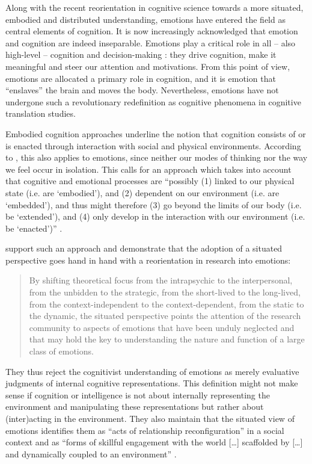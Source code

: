 \documentclass[output=paper]{langscibook}
\begin{document}
Along with the recent reorientation in cognitive science towards a more situated, embodied and distributed understanding, emotions have entered the field as central elements of cognition. It is now increasingly acknowledged that emotion and cognition are indeed inseparable. Emotions play a critical role in all -- also high-level -- cognition and decision-making \citep{Damasio1994, Damasio1999}: they drive cognition, make it meaningful and steer our attention and motivations. From this point of view, emotions are allocated a primary role in cognition, and it is emotion that “enslaves” the brain and moves the body. Nevertheless, emotions have not undergone such a revolutionary redefinition as cognitive phenomena in cognitive translation studies.

Embodied cognition approaches underline the notion that cognition consists of or is enacted through interaction with social and physical environments. According to \citet[67]{Stephan2014}, this also applies to emotions, since neither our modes of thinking nor the way we feel occur in isolation. This calls for an approach which takes into account that cognitive and emotional processes are “possibly (1) linked to our physical state (i.e. are ‘embodied’), and (2) dependent on our environment (i.e. are ‘embedded’), and thus might therefore (3) go beyond the limits of our body (i.e. be ‘extended’), and (4) only develop in the interaction with our environment (i.e. be ‘enacted’)” \citep[285; translated by the authors]{Wilutzky2011}.

\citet[438]{Griffiths2009} support such an approach and demonstrate that the adoption of a situated perspective goes hand in hand with a reorientation in research into emotions:

\begin{quote}\sloppy
    By shifting theoretical focus from the intrapsychic to the interpersonal, from the unbidden to the strategic, from the short-lived to the long-lived, from the context-independent to the context-dependent, from the static to the dynamic, the situated perspective points the attention of the research community to aspects of emotions that have been unduly neglected and that may hold the key to understanding the nature and function of a large class of emotions.\hfill\citep[448f]{Griffiths2009}
\end{quote}

\noindent
They thus reject the cognitivist understanding of emotions as merely evaluative judgments of internal cognitive representations. This definition might not make sense if cognition or intelligence is not about internally representing the environment and manipulating these representations but rather about (inter)acting in the environment. They also maintain that the situated view of emotions identifies them as “acts of relationship reconfiguration” in a social context and as “forms of skillful engagement with the world […] scaffolded by […] and dynamically coupled to an environment” \citep[438]{Griffiths2009}.
\end{document}
